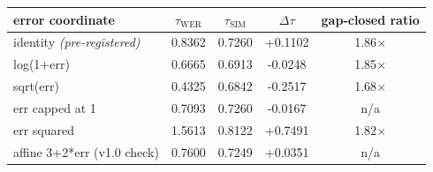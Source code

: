\begin{tabular}{lcccc}
  \toprule
  error coordinate & $\tau_{\mathrm{WER}}$ & $\tau_{\mathrm{SIM}}$ & $\Delta\tau$ & gap-closed ratio \\
  \midrule
    identity \emph{(pre-registered)} & 0.8362 & 0.7260 & +0.1102 & 1.86$\times$ \\
    log(1+err) & 0.6665 & 0.6913 & -0.0248 & 1.85$\times$ \\
    sqrt(err) & 0.4325 & 0.6842 & -0.2517 & 1.68$\times$ \\
    err capped at 1 & 0.7093 & 0.7260 & -0.0167 & n/a \\
    err squared & 1.5613 & 0.8122 & +0.7491 & 1.82$\times$ \\
    affine 3+2*err (v1.0 check) & 0.7600 & 0.7249 & +0.0351 & n/a \\
  \bottomrule
\end{tabular}
